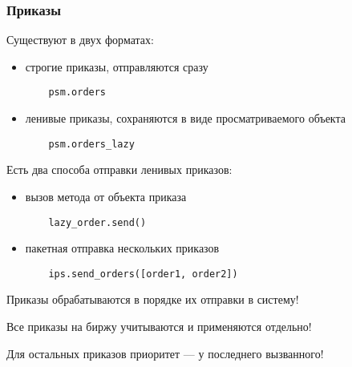 \subsubsection*{Приказы}

Существуют в двух форматах: 

\begin{itemize}
    \item строгие приказы, отправляются сразу 
    \begin{verbatim} 
    psm.orders 
    \end{verbatim} 
   
    \item ленивые приказы, сохраняются в виде просматриваемого объекта
    \begin{verbatim} 
    psm.orders_lazy 
    \end{verbatim}    
\end{itemize}

Есть два способа отправки ленивых приказов: 

\begin{itemize}
    \item вызов метода от объекта приказа
    \begin{verbatim}
    lazy_order.send() 
    \end{verbatim} 
     
    \item пакетная отправка нескольких приказов 
    \begin{verbatim}
    ips.send_orders([order1, order2]) 
    \end{verbatim} 
   
\end{itemize}


Приказы обрабатываются в порядке их отправки в систему! 

Все приказы на биржу учитываются и применяются отдельно! 

Для остальных приказов приоритет — у последнего вызванного! 


